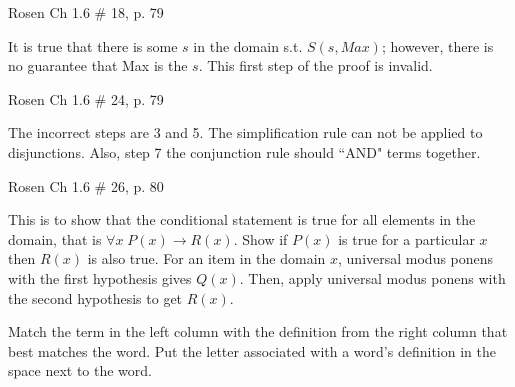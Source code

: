\documentclass[12pt,addpoints]{exam}
\newcommand{\ra}{\rightarrow}
\begin{document}
\begin{questions}
\question Rosen Ch 1.6 \# 18, p. 79
    \ifprintanswers
        \vspace{-10pt}
    \fi
\begin{solution}
    It is true that there is some $s$ in the domain s.t. $S(s,Max)$; however, there is no guarantee that Max is the $s$.  This first step of the proof is invalid.
\end{solution}


\question Rosen Ch 1.6 \# 24, p. 79
    \ifprintanswers
        \vspace{-10pt}
    \fi
\begin{solution}
    The incorrect steps are 3 and 5.  The simplification rule can not be applied to disjunctions.  Also, step 7 the conjunction rule should ``AND" terms together.
\end{solution}


\question Rosen Ch 1.6 \# 26, p. 80
    \ifprintanswers
        \vspace{-10pt}
    \fi
\begin{solution}
    This is to show that the conditional statement is true for all elements in the domain, that is $\forall x\; P(x) \ra R(x)$.  Show if $P(x)$ is true for a particular $x$ then $R(x)$ is also true.  For an item in the domain $x$, universal modus ponens with the first hypothesis gives $Q(x)$.  Then, apply universal modus ponens with the second hypothesis to get $R(x)$.
\end{solution}


\question  Match the term in the left column with the definition
from the right column that best matches the word.  Put the letter
associated with a word's definition in the space next to the word.


\end{questions}
\end{document}
